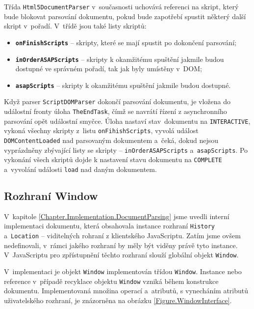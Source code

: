 Třída \texttt{Html5DocumentParser} v~současnosti uchovává referenci na skript, který bude blokovat parsování dokumentu, pokud bude zapotřebí spustit některý další skript v~pořadí. V~třídě jsou také listy skriptů:

\begin{itemize}
  \item \textbf{\texttt{onFinishScripts}} -- skripty, které se mají spustit po dokončení parsování;
  \item \textbf{\texttt{inOrderASAPScripts}} -- skripty k okamžitému spuštění jakmile budou dostupné ve správném pořadí, tak jak byly umístěny v~DOM;
  \item \textbf{\texttt{asapScripts}} -- skripty k okamžitému spuštění jakmile budou dostupné. 
\end{itemize}

Když parser \texttt{ScriptDOMParser} dokončí parsování dokumentu, je vložena do událostní fronty úloha \texttt{TheEndTask}, čímž se navrátí řízení z asynchronního parsování opět událostní smyčce. Úloha nastaví stav~dokumentu na \texttt{INTERACTIVE}, vykoná všechny skripty z~listu \texttt{onFihishScripts}, vyvolá událost \texttt{DOMContentLoaded} nad parsovaným dokumentem a~čeká, dokud nejsou vyprázdněny zbývající listy se skripty -- \texttt{inOrderASAPScripts} a~\texttt{asapScripts}. Po vykonání všech skriptů dojde k nastavení stavu dokumentu na \texttt{COMPLETE} a~vyvolání události \texttt{load} nad daným dokumentem. 

\subsection{Rozhraní Window}
\label{Chapter.Implementation.WindowInterface}

V~kapitole \ref{Chapter.Implementation.DocumentParsing} jsme uvedli interní implementaci dokumentu, která obsahovala instance rozhraní \texttt{History} a~\texttt{Location} -- viditelných rohraní z klientského JavaScriptu. Zatím jsme ovšem nedefinovali, v~rámci jakého rozhraní by měly být viděny právě tyto instance. V~JavaScriptu pro zpřístupnění těchto rozhraní slouží globální objekt \texttt{Window}.

V~implementaci je objekt \texttt{Window} implementován třídou \texttt{Window}. Instance nebo reference v~případě recyklace objektu \texttt{Window} vzniká během konstrukce dokumentu. Implementovaná množina operací a~atributů, s vynecháním atributů uživatelského rozhraní, je znázorněna na obrázku \ref{Figure.WindowInterface}. 

